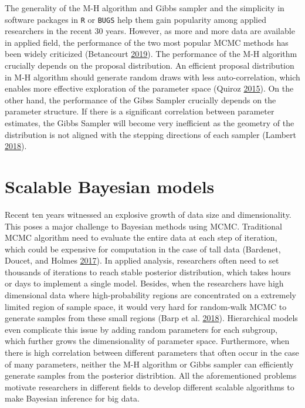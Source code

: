 \documentclass[12pt]{book}
\numberwithin{equation}{chapter}
\begin{document}
The generality of the M-H algorithm and Gibbs sampler and the simplicity in software packages in \texttt{R} or \texttt{BUGS} help them gain popularity among applied researchers in the recent 30 years. However, as more and more data are available in applied field, the performance of the two most popular MCMC methods has been widely criticized (Betancourt \protect\hyperlink{ref-betancourt2019convergence}{2019}). The performance of the M-H algorithm crucially depends on the proposal distribution. An efficient proposal distribution in M-H algorithm should generate random draws with less auto-correlation, which enables more effective exploration of the parameter space (Quiroz \protect\hyperlink{ref-quiroz2015bayesian}{2015}). On the other hand, the performance of the Gibss Sampler crucially depends on the parameter structure. If there is a significant correlation between parameter estimates, the Gibbs Sampler will become very inefficient as the geometry of the distribution is not aligned with the stepping directions of each sampler (Lambert \protect\hyperlink{ref-lambert2018student}{2018}).

\hypertarget{scalable-bayesian-models}{%
\section{Scalable Bayesian models}\label{scalable-bayesian-models}}

Recent ten years witnessed an explosive growth of data size and dimensionality. This poses a major challenge to Bayesian methods using MCMC. Traditional MCMC algorithm need to evaluate the entire data at each step of iteration, which could be expensive for computation in the case of tall data (Bardenet, Doucet, and Holmes \protect\hyperlink{ref-bardenet2017markov}{2017}). In applied analysis, researchers often need to set thousands of iterations to reach stable posterior distribution, which takes hours or days to implement a single model. Besides, when the researchers have high dimensional data where high-probability regions are concentrated on a extremely limited region of sample space, it would very hard for random-walk MCMC to generate samples from these small regions (Barp et al. \protect\hyperlink{ref-barp2018geometry}{2018}). Hierarchical models even complicate this issue by adding random parameters for each subgroup, which further grows the dimensionality of parameter space. Furthermore, when there is high correlation between different parameters that often occur in the case of many parameters, neither the M-H algorithm or Gibbs sampler can efficiently generate samples from the posterior distribtion. All the aforementioned problems motivate researchers in different fields to develop different scalable algorithms to make Bayesian inference for big data.
\end{document}
